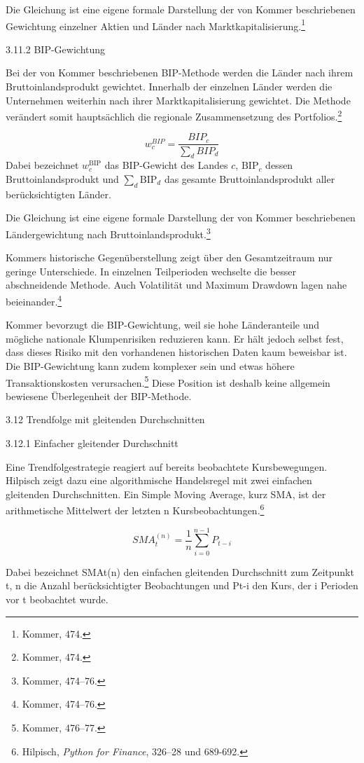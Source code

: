 \documentclass[
  ngerman,
  a4paper,
  DIV=11,
  oneside]{scrreprt}
\begin{document}
Die Gleichung ist eine eigene formale Darstellung der von Kommer
beschriebenen Gewichtung einzelner Aktien und Länder nach
Marktkapitalisierung.\footnote{Kommer, 474.}

3.11.2 BIP-Gewichtung

Bei der von Kommer beschriebenen BIP-Methode werden die Länder nach
ihrem Bruttoinlandsprodukt gewichtet. Innerhalb der einzelnen Länder
werden die Unternehmen weiterhin nach ihrer Marktkapitalisierung
gewichtet. Die Methode verändert somit hauptsächlich die regionale
Zusammensetzung des Portfolios.\footnote{Kommer, 474.}

\[
w_c^{BIP}=\frac{BIP_c}{\sum_d BIP_d}
\] Dabei bezeichnet \textbf{\(w_c^{\mathrm{BIP}}\)} das BIP-Gewicht des
Landes \textbf{\(c\)}, \textbf{\(\mathrm{BIP}_c\)} dessen
Bruttoinlandsprodukt und \textbf{\(\sum_d \mathrm{BIP}_d\)} das gesamte
Bruttoinlandsprodukt aller berücksichtigten Länder.

Die Gleichung ist eine eigene formale Darstellung der von Kommer
beschriebenen Ländergewichtung nach Bruttoinlandsprodukt.\footnote{Kommer,
  474--76.}

Kommers historische Gegenüberstellung zeigt über den Gesamtzeitraum nur
geringe Unterschiede. In einzelnen Teilperioden wechselte die besser
abschneidende Methode. Auch Volatilität und Maximum Drawdown lagen nahe
beieinander.\footnote{Kommer, 474--76.}

Kommer bevorzugt die BIP-Gewichtung, weil sie hohe Länderanteile und
mögliche nationale Klumpenrisiken reduzieren kann. Er hält jedoch selbst
fest, dass dieses Risiko mit den vorhandenen historischen Daten kaum
beweisbar ist. Die BIP-Gewichtung kann zudem komplexer sein und etwas
höhere Transaktionskosten verursachen.\footnote{Kommer, 476--77.} Diese
Position ist deshalb keine allgemein bewiesene Überlegenheit der
BIP-Methode.

3.12 Trendfolge mit gleitenden Durchschnitten

3.12.1 Einfacher gleitender Durchschnitt

Eine Trendfolgestrategie reagiert auf bereits beobachtete
Kursbewegungen. Hilpisch zeigt dazu eine algorithmische Handelsregel mit
zwei einfachen gleitenden Durchschnitten. Ein Simple Moving Average,
kurz SMA, ist der arithmetische Mittelwert der letzten n
Kursbeobachtungen.\footnote{Hilpisch, \emph{Python for Finance}, 326--28
  und 689-692.}

\[
SMA_t^{(n)}=\frac{1}{n}\sum_{i=0}^{n-1}P_{t-i}
\]

Dabei bezeichnet SMAt(n) den einfachen gleitenden Durchschnitt zum
Zeitpunkt t, n die Anzahl berücksichtigter Beobachtungen und Pt-i den
Kurs, der i Perioden vor t beobachtet wurde.
\end{document}
